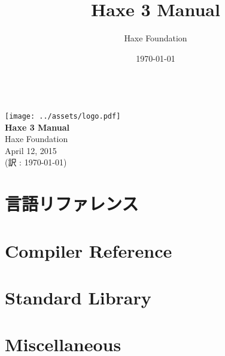 \documentclass{../haxe}
\renewcommand{\maketitle}{
   \begin{titlepage}
     \setcounter{page}{-1}
			\begin{center}
				~\\[3cm]
				\texttt{[image: ../assets/logo.pdf]}~\\[1cm]
				{\huge \bfseries Haxe 3 Manual}\\[7cm]
				Haxe Foundation\\
				April 12, 2015\\
				(訳 : \today)
			\end{center}
   \end{titlepage}
}
\begin{document}
\title{Haxe 3 Manual}
\author{Haxe Foundation}
\date{\today}
\maketitle


\clearpage
\todototoc
\listoftodos
\clearpage

\clearpage
\tableofcontents
\clearpage



\part{言語リファレンス}






\part{Compiler Reference}




\part{Standard Library}


\part{Miscellaneous}


\end{document}
